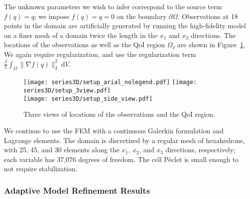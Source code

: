 The unknown parameters we wish to infer correspond to the source term $f(q)=q$; we impose $f(q)=q=0$ on the boundary $\partial\Omega$. Observations at 18 points in the domain are artificially generated by running the high-fidelity model on a finer mesh of a domain twice the length in the $x_1$ and $x_2$ directions. The locations of the observations as well as the QoI region $\Omega_I$ are shown in Figure~\ref{fig:setup3D}. We again require regularization, and use the regularization term $\frac{\beta}{2}\int_\Omega \|\nabla f(q)\|_2^2\:\textrm{d}V$.
%
\begin{figure}[h]
\centering
\texttt{[image: series3D/setup\_arial\_nolegend.pdf]} \hfill
\texttt{[image: series3D/setup\_3view.pdf]} \\ 
\vspace{\baselineskip}
\texttt{[image: series3D/setup\_side\_view.pdf]}
\caption{Three views of locations of the observations and the QoI region.}
\label{fig:setup3D}
\end{figure}
%

We continue to use the FEM with a continuous Galerkin formulation and Lagrange elements. The domain is discretized by a regular mesh of hexahedrons, with 25, 45, and 30 elements along the $x_1$, $x_2$, and $x_3$ directions, respectively; each variable has 37,076 degrees of freedom. The cell P\'{e}clet is small enough to not require stabilization.

\subsubsection{Adaptive Model Refinement Results} \label{sec:ref3D}

